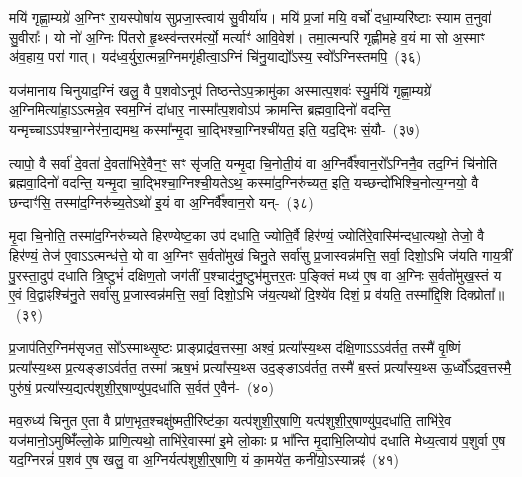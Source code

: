 {\anuvakamend[{यान्य॒ग्नय॒ इत्या॒हेष्ट॑काना॒ꣳ॒ षोड॑श च}]}

मयि॑ गृह्णा॒म्यग्रे॑ अ॒ग्निꣳ रा॒यस्पोषा॑य सुप्रजा॒स्त्वाय॑ सु॒वीर्या॑य। मयि॑ प्र॒जां मयि॒ वर्चो॑ दधा॒म्यरि॑ष्टाः स्याम त॒नुवा॑ सु॒वीराः᳚। यो नो॑ अ॒ग्निः पि॑तरो हृ॒थ्स्व॑न्तरम॑र्त्यो॒ मर्त्याꣳ॑ आवि॒वेश॑। तमा॒त्मन्परि॑ गृह्णीमहे व॒यं मा सो अ॒स्माꣳ अ॑व॒हाय॒ परा॑ गात्। यद॑ध्व॒र्युरा॒त्मन्न॒ग्निमगृ॑हीत्वा॒\-ऽग्निं चि॑नु॒याद्यो᳚\-ऽस्य॒ स्वो᳚\-ऽग्निस्तमपि॒~(३६)\ip

यज॑मानाय चिनुयाद॒ग्निं खलु॒ वै प॒शवो\-ऽनूप॑ तिष्ठन्ते\-ऽप॒क्रामु॑का अस्मात्प॒शवः॑ स्यु॒र्मयि॑ गृह्णा॒म्यग्रे॑ अ॒ग्निमित्या॑हा॒\-ऽऽत्मन्ने॒व स्वम॒ग्निं दा॑धार॒ नास्मा᳚त्प॒शवो\-ऽप॑ क्रामन्ति ब्रह्मवा॒दिनो॑ वदन्ति॒ यन्मृच्चा\-ऽऽप॑श्चा॒ग्नेर॑ना॒द्यमथ॒ कस्मा᳚न्मृ॒दा चा॒द्भिश्चा॒ग्निश्ची॑यत॒ इति॒ यद॒द्भिः सं॒यौ-~(३७)\ip

त्यापो॒ वै सर्वा॑ दे॒वता॑ दे॒वता॑भिरे॒वैन॒ꣳ॒ सꣳ सृ॑जति॒ यन्मृ॒दा चि॒नोती॒यं वा अ॒ग्निर्वै᳚श्वान॒रो᳚\-ऽग्निनै॒व तद॒ग्निं चि॑नोति ब्रह्मवा॒दिनो॑ वदन्ति॒ यन्मृ॒दा चा॒द्भिश्चा॒ग्निश्ची॒यते\-ऽथ॒ कस्मा॑द॒ग्निरु॑च्यत॒ इति॒ यच्छन्दो॑भिश्चि॒नोत्य॒ग्नयो॒ वै छन्दाꣳ॑सि॒ तस्मा॑द॒ग्निरु॑च्य॒ते\-ऽथो॑ इ॒यं वा अ॒ग्निर्वै᳚श्वान॒रो यन्-~(३८)\ip

मृ॒दा चि॒नोति॒ तस्मा॑द॒ग्निरु॑च्यते हिरण्येष्ट॒का उप॑ दधाति॒ ज्योति॒र्वै हिर॑ण्यं॒ ज्योति॑रे॒वास्मि॑न्दधा॒त्यथो॒ तेजो॒ वै हिर॑ण्यं॒ तेज॑ ए॒वा\-ऽऽ\-त्मन्ध॑त्ते॒ यो वा अ॒ग्निꣳ स॒र्वतो॑मुखं चिनु॒ते सर्वा॑सु प्र॒जास्वन्न॑मत्ति॒ सर्वा॒ दिशो॒\-ऽभि ज॑यति गाय॒त्रीं पु॒रस्ता॒दुप॑ दधाति त्रि॒ष्टुभं॑ दक्षिण॒तो जग॑तीं प॒श्चाद॑नु॒ष्टुभ॑मुत्तर॒तः प॒ङ्क्तिं मध्य॑ ए॒ष वा अ॒ग्निः स॒र्वतो॑मुख॒स्तं य ए॒वं वि॒द्वाꣴश्चि॑नु॒ते सर्वा॑सु प्र॒जास्वन्न॑मत्ति॒ सर्वा॒ दिशो॒\-ऽभि ज॑य॒त्यथो॑ दि॒श्ये॑व दिशं॒ प्र व॑यति॒ तस्मा᳚द्\-दि॒शि दिक्प्रोता᳚॥~(३९)\ip

{\anuvakamend[{अपि॑ सं॒ यौति॑ वैश्वान॒रो यदे॒ष वै पञ्च॑विꣳशतिश्च}]}

प्र॒जा\-प॑तिर॒ग्निम॑सृजत॒ सो᳚\-ऽस्माथ्सृ॒ष्टः प्राङ्प्राद्र॑व॒त्तस्मा॒ अश्वं॒ प्रत्या᳚स्य॒थ्स द॑क्षि॒णा\-ऽऽ\-ऽव॑र्तत॒ तस्मै॑ वृ॒ष्णिं प्रत्या᳚स्य॒थ्स प्र॒त्यङ्ङा\-ऽव॑र्तत॒ तस्मा॑ ऋष॒भं प्रत्या᳚स्य॒थ्स उद॒ङ्ङा\-ऽव॑र्तत॒ तस्मै॑ ब॒स्तं प्रत्या᳚स्य॒थ्स ऊ॒र्ध्वो᳚\-ऽद्रव॒त्तस्मै॒ पुरु॑षं॒ प्रत्या᳚स्य॒द्यत्प॑शुशी॒र्॒\mbox{}षाण्यु॑प॒\-दधा॑ति स॒र्वत॑ ए॒वैन॑-~(४०)\ip

मव॒रुध्य॑ चिनुत ए॒ता वै प्रा॑ण॒भृत॒श्चक्षु॑ष्मती॒रिष्ट॑का॒ यत्प॑शुशी॒र्॒\mbox{}षाणि॒ यत्प॑शुशी॒र्॒\mbox{}षाण्यु॑प॒\-दधा॑ति॒ ताभि॑रे॒व यज॑मानो॒\-ऽमुष्मिँ॑ल्लो॒के प्राणि॒त्यथो॒ ताभि॑रे॒वास्मा॑ इ॒मे लो॒काः प्र भा᳚न्ति मृ॒दाभि॒लिप्योप॑ दधाति मेध्य॒त्वाय॑ प॒शुर्वा ए॒ष यद॒ग्निरन्नं॑ प॒शव॑ ए॒ष खलु॒ वा अ॒ग्निर्यत्प॑शुशी॒र्॒\mbox{}षाणि॒ यं का॒मये॑त॒ कनी॑यो॒\-ऽस्यान्नꣴ॑~(४१)\ip

